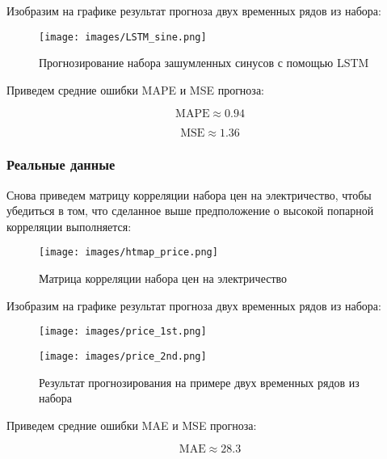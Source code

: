 \documentclass{article}
\begin{document}
\newpage

 Изобразим на графике результат прогноза двух временных рядов из набора:

\begin{figure}[!htbp]
\centering
{\texttt{[image: images/LSTM\_sine.png]} }
\caption{Прогнозирование набора зашумленных синусов с помощью LSTM}
\label{fig:LSTMsine}
\end{figure}

Приведем средние ошибки MAPE и MSE прогноза:

\begin{equation}
    \text{MAPE} \approx 0.94
\end{equation}

\begin{equation}
    \text{MSE} \approx 1.36
\end{equation}

\subsubsection{Реальные данные}

Снова приведем матрицу корреляции набора цен на электричество, чтобы убедиться в том, что сделанное выше предположение о высокой попарной корреляции выполняется:

\begin{figure}[!htbp]
\centering
{\texttt{[image: images/htmap\_price.png]} }
\caption{Матрица корреляции набора цен на электричество}
\label{fig:Heatprice}
\end{figure}

 Изобразим на графике результат прогноза двух временных рядов из набора:

\begin{figure}[h]
  \begin{minipage}{0.5\textwidth}
    \centering
    \texttt{[image: images/price\_1st.png]}
  \end{minipage}\hfill
  \begin{minipage}{0.5\textwidth}
    \centering
    \texttt{[image: images/price\_2nd.png]}
  \end{minipage}
  \caption{Результат прогнозирования на примере двух временных рядов из набора}
\end{figure}

Приведем средние ошибки MAE и MSE прогноза:

\begin{equation}
    \text{MAE} \approx 28.3
\end{equation}
\end{document}
